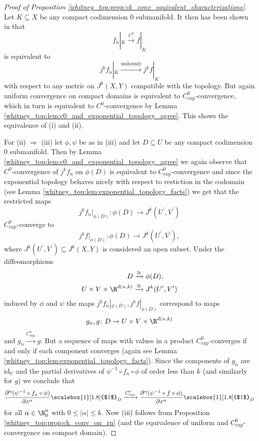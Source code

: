 \begin{proof}[Proof of Proposition \ref{whitney_top:prop:ck_conv_equivalent_characterizations}]
    Let $K \subseteq X$ be any compact codimension $0$ submanifold. It then has been shown in \cite{golubitsky2012stable} that 
    \[
    f_n|_K \xrightarrow{C^k} f|_K
    \]
    is equivalent to 
    \[
    j^kf_n|_K \xrightarrow{\mathrm{uniformly}}j^kf|_K
    \]
    with respect to any metric on $J^k(X,Y)$ compatible with the topology. But again uniform convergence on compact domains is equivalent to $C^0_\mathrm{exp}$-convergence, which in turn is equivalent to $C^0$-convergence by Lemma \ref{whitney_top:lem:c0_and_exponential_topology_agree}. This shows the equivalence of (i) and (ii). 
    
    For (ii) $\Rightarrow$ (iii) let $\phi,\psi$ be as in (iii) and let $D\subseteq U$ be any compact codimension $0$ submanifold. Then by Lemma \ref{whitney_top:lem:c0_and_exponential_topology_agree} we again observe that $C^0$-convergence of $j^kf_n$ on $\phi(D)$ is equivalent to $C^0_\mathrm{exp}$-convergence and since the exponential topology behaves nicely with respect to restiction in the codomain (see Lemma \ref{whitney_top:lem:exponential_topology_facts}) we get that the restricted maps 
    \[
    j^kf_n|_{\phi(D)} \colon \phi(D) \to J^k(U^\prime,V^\prime)
    \]
    $C^0_\mathrm{exp}$-converge to 
    \[
    j^kf|_{\phi(D)} \colon \phi(D) \to J^k(U^\prime,V^\prime),
    \]
    where $J^k(U^\prime,V^\prime) \subseteq J^k(X,Y)$ is considered an open subset. Under the diffeomorphisms
    \begin{align*}
        D &\xrightarrow{\cong} \phi(D), \\
        U \times V \times \R^{d(n,k)} &\xrightarrow{\cong} J^k(U^\prime,V^\prime)
    \end{align*}
    induced by $\phi$ and $\psi$ the maps $j^kf_n|_{\phi(D)}, j^kf|_{\phi(D)}$ correspond to maps 
    \[
    g_n,g \colon D \to U \times V \times \R^{d(n,k)}
    \]
    and $g_n \xrightarrow{C^0_\mathrm{exp}} g$. But a sequence of maps with values in a product $C^0_\mathrm{exp}$-converges if and only if each component converges (again see Lemma \ref{whitney_top:lem:exponential_topology_facts}). Since the components of $g_n$ are $\mathrm{id}_U$ and the partial derivatives of $\psi^{-1} \circ f_n \circ \phi$ of order less than $k$ (and similiarly for $g$) we conclude that 
    \[
    \frac{\partial^\alpha(\psi^{-1} \circ f_n \circ \phi)}{\partial x^\alpha}\scalebox{1}[1.8]{$|$}_D \xrightarrow{C^0_\mathrm{exp}} \frac{\partial^\alpha(\psi^{-1} \circ f \circ \phi)}{\partial x^\alpha}\scalebox{1}[1.8]{$|$}_D
    \]    
    for all $\alpha \in \N_0^n$ with $0 \leq |\alpha| \leq k$. Now (iii) follows from Proposition \ref{whitney_top:prop:ck_conv_on_rn} (and the equivalence of uniform and $C^0_\mathrm{exp}$-convergence on compact domain). 


\end{proof}
